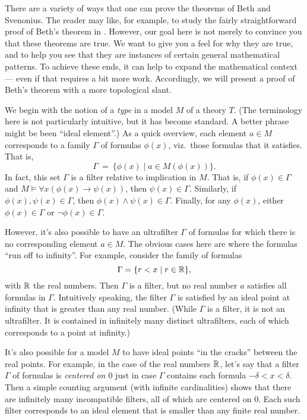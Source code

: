 There are a variety of ways that one can prove the theorems of Beth
and Svenonius.  The reader may like, for example, to study the fairly
straightforward proof of Beth's theorem in \cite[Chap 20]{boolos}.
However, our goal here is not merely to convince you that these
theorems are true.  We want to give you a feel for why they are true,
and to help you see that they are instances of certain general
mathematical patterns.  To achieve these ends, it can help to expand
the mathematical context --- even if that requires a bit more work.
Accordingly, we will present a proof of Beth's theorem with a more
topological slant.

We begin with the notion of a \emph{type} in a model $M$ of a theory
$T$.  (The terminology here is not particularly intuitive, but it has
become standard.  A better phrase might be been ``ideal element''.)
As a quick overview, each element $a\in M$ corresponds to a family
$\Gamma$ of formulas $\phi (x)$, viz.\ those formulas that it
satisfies.  That is,
\[ \Gamma \: = \: \{ \phi (x) \mid a\in M(\phi (x)) \} .\] In fact,
this set $\Gamma$ is a filter relative to implication in $M$.  That
is, if $\phi (x)\in \Gamma$ and
$M\models \forall x(\phi (x)\to \psi (x))$, then $\psi (x)\in \Gamma$.
Similarly, if $\phi (x),\psi (x)\in \Gamma$, then
$\phi (x)\wedge \psi (x)\in \Gamma$.  Finally, for any $\phi (x)$,
either $\phi (x)\in\Gamma$ or $\neg\phi (x)\in\Gamma$.

However, it's also possible to have an ultrafilter $\Gamma$ of
formulas for which there is no corresponding element $a\in M$.  The
obvious cases here are where the formulas ``run off to infinity''.
For example, consider the family of formulas
\[ \Gamma = \{ r<x \mid r\in \mathbb R \} ,\] with $\mathbb R$ the real numbers.
Then $\Gamma$ is a filter, but no real number $a$ satisfies all
formulas in $\Gamma$.  Intuitively speaking, the filter $\Gamma$ is
satisfied by an ideal point at infinity that is greater than any real
number.  (While $\Gamma$ is a filter, it is not an ultrafilter.  It is
contained in infinitely many distinct ultrafilters, each of which
corresponds to a point at infinity.)

It's also possible for a model $M$ to have ideal points ``in the
cracks'' between the real points.  For example, in the case of the
real numbers $\mathbb R$, let's say that a filter $\Gamma$ of formulas is
{\it centered on $0$} just in case $\Gamma$ contains each formula
$-\delta <x<\delta$.  Then a simple counting argument (with infinite
cardinalities) shows that there are infinitely many incompatible
filters, all of which are centered on $0$.  Each such filter
corresponds to an ideal element that is smaller than any finite real
number.

